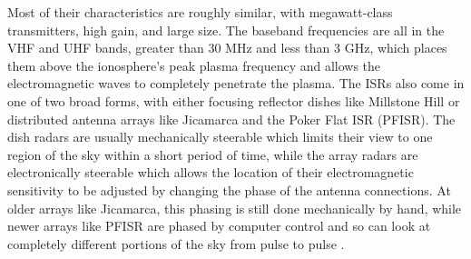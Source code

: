 Most of their characteristics are roughly similar, with megawatt-class transmitters, high gain, and large size. The baseband frequencies are all in the VHF and UHF bands, greater than 30 MHz and less than 3 GHz, which places them above the ionosphere's peak plasma frequency and allows the electromagnetic waves to completely penetrate the plasma. The ISRs also come in one of two broad forms, with either focusing reflector dishes like Millstone Hill or distributed antenna arrays like Jicamarca and the Poker Flat ISR (PFISR). The dish radars are usually mechanically steerable which limits their view to one region of the sky within a short period of time, while the array radars are electronically steerable which allows the location of their electromagnetic sensitivity to be adjusted by changing the phase of the antenna connections. At older arrays like Jicamarca, this phasing is still done mechanically by hand, while newer arrays like PFISR are phased by computer control and so can look at completely different portions of the sky from pulse to pulse \autocite{Och63, CGHN09}.

